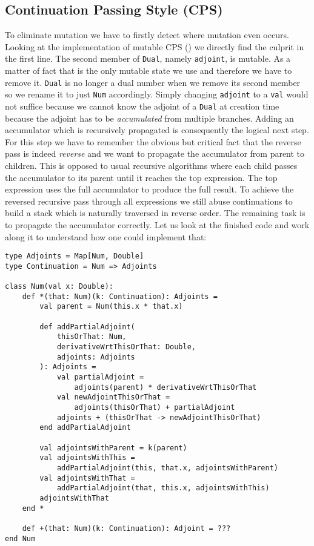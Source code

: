 \subsection{Continuation Passing Style (CPS)} \label{sec:functionalCps}

To eliminate mutation we have to firstly detect where mutation even occurs. Looking at the implementation of mutable CPS () we directly find the culprit in the first line. The second member of \lstinline{Dual}, namely \lstinline{adjoint}, is mutable. As a matter of fact that is the only mutable state we use and therefore we have to remove it. \lstinline{Dual} is no longer a dual number when we remove its second member so we rename it to just \lstinline{Num} accordingly. Simply changing \lstinline{adjoint} to a \lstinline{val} would not suffice because we cannot know the adjoint of a \lstinline{Dual} at creation time because the adjoint has to be \emph{accumulated} from multiple branches. Adding an accumulator which is recursively propagated is consequently the logical next step. For this step we have to remember the obvious but critical fact that the reverse pass is indeed \emph{reverse} and we want to propagate the accumulator from parent to children. This is opposed to usual recursive algorithms where each child passes the accumulator to its parent until it reaches the top expression. The top expression uses the full accumulator to produce the full result. To achieve the reversed recursive pass through all expressions we still abuse continuations to build a stack which is naturally traversed in reverse order. The remaining task is to propagate the accumulator correctly. Let us look at the finished code and work along it to understand how one could implement that:
\pagebreak
\begin{lstlisting}
type Adjoints = Map[Num, Double]
type Continuation = Num => Adjoints

class Num(val x: Double):
    def *(that: Num)(k: Continuation): Adjoints =
        val parent = Num(this.x * that.x)

        def addPartialAdjoint(
            thisOrThat: Num, 
            derivativeWrtThisOrThat: Double, 
            adjoints: Adjoints
        ): Adjoints =
            val partialAdjoint = 
                adjoints(parent) * derivativeWrtThisOrThat
            val newAdjointThisOrThat = 
                adjoints(thisOrThat) + partialAdjoint
            adjoints + (thisOrThat -> newAdjointThisOrThat)
        end addPartialAdjoint

        val adjointsWithParent = k(parent)
        val adjointsWithThis = 
            addPartialAdjoint(this, that.x, adjointsWithParent)
        val adjointsWithThat = 
            addPartialAdjoint(that, this.x, adjointsWithThis)
        adjointsWithThat
    end *

    def +(that: Num)(k: Continuation): Adjoint = ???
end Num
\end{lstlisting}
